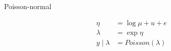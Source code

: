 \documentclass{article}
\begin{document}
Poisson-normal

\begin{align*}
\eta & = \log{\mu} + u + e \\
\lambda & = \exp{\eta} \\
\left.y \middle| \lambda\right. & = Poisson\left(\lambda\right)
\end{align*}
\end{document}
